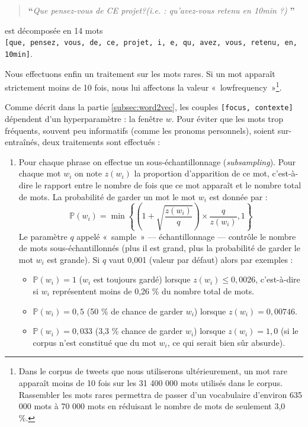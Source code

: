 \documentclass[11pt,french,french]{article}
\providecommand{\tightlist}{%
  \setlength{\parskip}{0pt}
  }
\let\rmarkdownfootnote\footnote%
\def\footnote{\protect\rmarkdownfootnote}
\begin{document}
\begin{quote}
\LARGE \textbf{``}\normalsize \emph{Que pensez-vous de CE projet?(i.e. : qu'avez-vous retenu en 10min ?)} \LARGE \textbf{''}\normalsize
\end{quote}

est décomposée en 14 mots
\texttt{{[}que,\ pensez,\ vous,\ de,\ ce,\ projet,\ i,\ e,\ qu,\ avez,\ vous,\ retenu,\ en,\ 10min{]}}.

Nous effectuons enfin un traitement sur les mots rares. Si un mot
apparaît strictement moins de 10 fois, nous lui affectons la valeur
«~lowfrequency~»\footnote{Dans le corpus de tweets que nous utiliserons
  ultérieurement, un mot rare apparaît moins de 10 fois sur les 31 400
  000 mots utilisés dans le corpus. Rassembler les mots rares permettra
  de passer d'un vocabulaire d'environ 635 000 mots à 70 000 mots en
  réduisant le nombre de mots de seulement 3,0 \%.}.

Comme décrit dans la partie \ref{subsec:word2vec}, les couples
\texttt{{[}focus,\ contexte{]}} dépendent d'un hyperparamètre : la
fenêtre \(w\). Pour éviter que les mots trop fréquents, souvent peu
informatifs (comme les pronoms personnels), soient sur-entraînés, deux
traitements sont effectués :

\begin{enumerate}
\def\labelenumi{\arabic{enumi}.}
\item
  Pour chaque phrase on effectue un sous-échantillonnage
  (\emph{subsampling}). Pour chaque mot \(w_i\) on note \(z(w_i)\) la
  proportion d'apparition de ce mot, c'est-à-dire le rapport entre le
  nombre de fois que ce mot apparaît et le nombre total de mots. La
  probabilité de garder un mot le mot \(w_i\) est donnée par : \[
  \mathbb P(w_i) = \min\left\{\left(1+\sqrt{\frac{z(w_i)}{q}}  \right)
  \times
  \frac{q}{z(w_i)},1\right\}
  \] Le paramètre \(q\) appelé «~sample~» --- échantillonnage ---
  contrôle le nombre de mots sous-échantillonnés (plus il est grand,
  plus la probabilité de garder le mot \(w_i\) est grande). Si \(q\)
  vaut 0,001 (valeur par défaut) alors par exemples :

  \begin{itemize}
  \tightlist
  \item
    \(\mathbb P(w_i) = 1\) (\(w_i\) est toujours gardé) lorsque
    \(z(w_i)\leq 0,0026\), c'est-à-dire si \(w_i\) représentent moins de
    0,26 \% du nombre total de mots.\\
  \item
    \(\mathbb P(w_i) = 0,5\) (50 \% de chance de garder \(w_i\)) lorsque
    \(z(w_i)=0,00746\).\\
  \item
    \(\mathbb P(w_i) = 0,033\) (3,3 \% chance de garder \(w_i\)) lorsque
    \(z(w_i)=1,0\) (si le corpus n'est constitué que du mot \(w_i\), ce
    qui serait bien sûr absurde).
  \end{itemize}
\end{enumerate}
\end{document}
